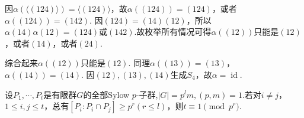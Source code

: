 \documentclass[../../main.tex]{subfiles}%
\begin{document}
\begin{solution}
因$\alpha(\langle(124)\rangle) = \langle(124)\rangle$，故$\alpha((124)) = (124)$，或者$\alpha((124)) = (142)$. 因$(124) = (14)(12)$，所以$\alpha(14)\alpha(12)=(124)$或$(142)$.故枚举所有情况可得$\alpha((12))$只能是$(12)$，或者$(14)$，或者$(24)$.

综合起来$\alpha((12))$只能是$(12)$.
同理$\alpha((13)) = (13)$，$\alpha((14)) = (14)$. 因$(12), (13), (14)$生成$S_4$，故$\alpha = \operatorname{id}$.

\end{solution}

\begin{example}
设$P_1,\cdots,P_t$是有限群$G$的全部Sylow $p$-子群,$|G|=p^lm,(p,m)=1$.若对$i\neq j$，$1\leqslant i,j\leqslant t$，总有$[P_i:P_i\cap P_j]\geqslant p^r(r\leqslant l)$，则$t\equiv 1\pmod{p^r}$.
\end{example}
\end{document}
